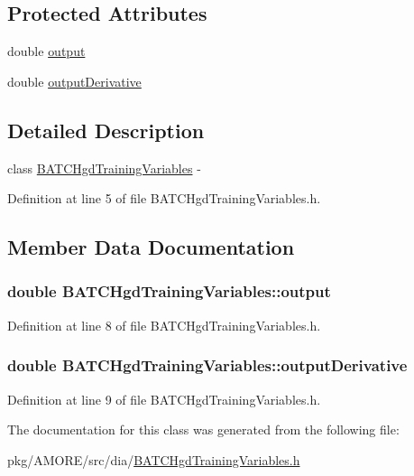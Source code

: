 \subsection*{Protected Attributes}
\begin{DoxyCompactItemize}
\item 
double \hyperlink{class_b_a_t_c_hgd_training_variables_a7cb844dac6feb79b1976cbd8db80c049}{output}
\item 
double \hyperlink{class_b_a_t_c_hgd_training_variables_ab02f509ad94944717a946c2cb16997fd}{outputDerivative}
\end{DoxyCompactItemize}


\subsection{Detailed Description}
class \hyperlink{class_b_a_t_c_hgd_training_variables}{BATCHgdTrainingVariables} -\/ 

Definition at line 5 of file BATCHgdTrainingVariables.h.



\subsection{Member Data Documentation}
\hypertarget{class_b_a_t_c_hgd_training_variables_a7cb844dac6feb79b1976cbd8db80c049}{
\subsubsection[{output}]{\setlength{\rightskip}{0pt plus 5cm}double {\bf BATCHgdTrainingVariables::output}}}
\label{class_b_a_t_c_hgd_training_variables_a7cb844dac6feb79b1976cbd8db80c049}


Definition at line 8 of file BATCHgdTrainingVariables.h.

\hypertarget{class_b_a_t_c_hgd_training_variables_ab02f509ad94944717a946c2cb16997fd}{
\subsubsection[{outputDerivative}]{\setlength{\rightskip}{0pt plus 5cm}double {\bf BATCHgdTrainingVariables::outputDerivative}}}
\label{class_b_a_t_c_hgd_training_variables_ab02f509ad94944717a946c2cb16997fd}


Definition at line 9 of file BATCHgdTrainingVariables.h.



The documentation for this class was generated from the following file:\begin{DoxyCompactItemize}
\item 
pkg/AMORE/src/dia/\hyperlink{_b_a_t_c_hgd_training_variables_8h}{BATCHgdTrainingVariables.h}\end{DoxyCompactItemize}
